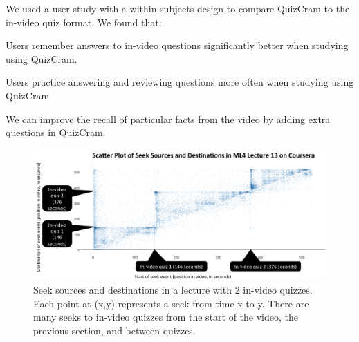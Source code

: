 \documentclass{sigchi}
\begin{document}
We used a user study with a within-subjects design to compare QuizCram to the in-video quiz format. We found that:


\begin{compactitem}
\item Users remember answers to in-video questions significantly better when studying using QuizCram.
\item Users practice answering and reviewing questions more often when studying using QuizCram
\item We can improve the recall of particular facts from the video by adding extra questions in QuizCram.
\end{compactitem}


\begin{figure}
\includegraphics[width=2.0 \columnwidth]{seek-scatterplot}
\caption{Seek sources and destinations in a lecture with 2 in-video quizzes. Each point at (x,y) represents a seek from time x to y. There are many seeks to in-video quizzes from the start of the video, the previous section, and between quizzes.} %
\label{fig:seek-scatterplot}
\end{figure}
\end{document}
